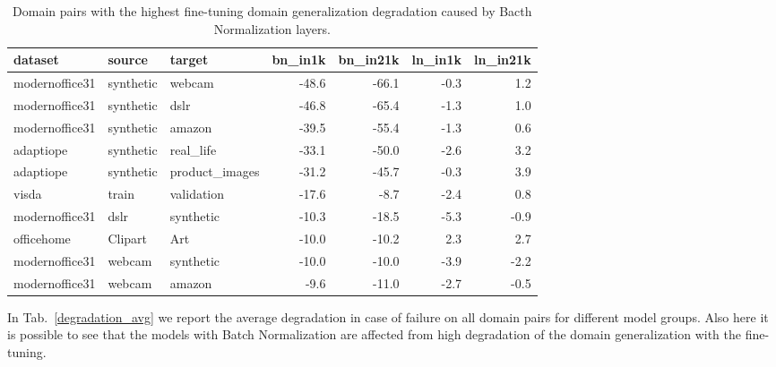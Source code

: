\documentclass{article}
\begin{document}
\begin{table}[h]
\caption{Domain pairs with the highest fine-tuning domain generalization degradation caused by Bacth Normalization layers.}
\vspace{0.5cm}
\label{degradation_table}
\begin{center}
\begin{footnotesize}

\begin{tabular}{lllrrrr}
\toprule
       dataset &    source &         target &  bn\_in1k &  bn\_in21k &  ln\_in1k &  ln\_in21k \\
\midrule
modernoffice31 & synthetic &         webcam &    -48.6 &     -66.1 &     -0.3 &       1.2 \\
modernoffice31 & synthetic &           dslr &    -46.8 &     -65.4 &     -1.3 &       1.0 \\
modernoffice31 & synthetic &         amazon &    -39.5 &     -55.4 &     -1.3 &       0.6 \\
     adaptiope & synthetic &      real\_life &    -33.1 &     -50.0 &     -2.6 &       3.2 \\
     adaptiope & synthetic & product\_images &    -31.2 &     -45.7 &     -0.3 &       3.9 \\
         visda &     train &     validation &    -17.6 &      -8.7 &     -2.4 &       0.8 \\
modernoffice31 &      dslr &      synthetic &    -10.3 &     -18.5 &     -5.3 &      -0.9 \\
    officehome &   Clipart &            Art &    -10.0 &     -10.2 &      2.3 &       2.7 \\
modernoffice31 &    webcam &      synthetic &    -10.0 &     -10.0 &     -3.9 &      -2.2 \\
modernoffice31 &    webcam &         amazon &     -9.6 &     -11.0 &     -2.7 &      -0.5 \\
\bottomrule
\end{tabular}
\end{footnotesize}
\end{center}

\end{table}

In Tab.~\ref{degradation_avg} we report the average degradation in case of failure on all domain pairs for different model groups. Also here it is possible to see that the models with Batch Normalization are affected from high degradation of the domain generalization with the fine-tuning.
\end{document}
